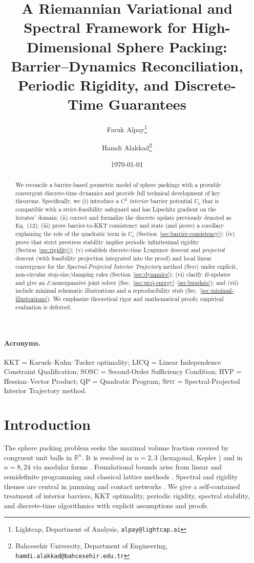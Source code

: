 \documentclass[11pt]{article}
\title{A Riemannian Variational and Spectral Framework for High-Dimensional Sphere Packing:\\
Barrier--Dynamics Reconciliation, Periodic Rigidity, and Discrete-Time Guarantees}
\author{%
  Faruk Alpay\thanks{Lightcap, Department of Analysis, \texttt{alpay@lightcap.ai}} \and
  Hamdi Alakkad\thanks{Bahcesehir University, Department of Engineering, \texttt{hamdi.alakkad@bahcesehir.edu.tr}}%
}
\date{\today}
\theoremstyle{remark}
\theoremstyle{definition}
\newcommand{\R}{\mathbb{R}}
\newcommand{\SPIT}{\textnormal{\textsc{Spit}}} %
\begin{document}
\maketitle

\begin{abstract}
We reconcile a barrier-based geometric model of sphere packings with a provably convergent discrete-time dynamics and provide full technical development of key theorems. Specifically, we (i) introduce a $C^2$ \emph{interior} barrier potential $U_\nu$ that is compatible with a strict-feasibility safeguard and has Lipschitz gradient on the iterates' domain; (ii) correct and formalize the discrete update previously denoted as Eq.~(12); (iii) prove barrier-to-KKT consistency and state (and prove) a corollary explaining the role of the quadratic term in $U_\nu$ (Section~\ref{sec:barrier-consistency}); (iv) prove that strict prestress stability implies periodic infinitesimal rigidity (Section~\ref{sec:rigidity}); (v) establish discrete-time Lyapunov descent and \emph{projected} descent (with feasibility projection integrated into the proof) and local linear convergence for the \emph{Spectral-Projected Interior Trajectory} method (\SPIT) under explicit, non-circular step-size/damping rules (Section~\ref{sec:dynamics}); (vi) clarify $B$-updates and give an \(\mathcal{E}\)-nonexpansive joint solver (Sec.~\ref{sec:proj-energy}--\ref{sec:bupdate}); and (vii) include minimal schematic illustrations and a reproducibility stub (Sec.~\ref{sec:minimal-illustrations}). We emphasize theoretical rigor and mathematical proofs; empirical evaluation is deferred.
\end{abstract}

\paragraph{Acronyms.}
KKT = Karush--Kuhn--Tucker optimality; LICQ = Linear Independence Constraint Qualification; SOSC = Second-Order Sufficiency Condition; HVP = Hessian--Vector Product; QP = Quadratic Program; \SPIT{} = Spectral-Projected Interior Trajectory method.

\section{Introduction}
The sphere packing problem seeks the maximal volume fraction covered by congruent unit balls in $\R^n$.
It is resolved in $n=2,3$ (hexagonal, Kepler \cite{Hales05,Hales17pi}) and in $n=8,24$ via modular forms \cite{Viazovska17,Cohn+17}.
Foundational bounds arise from linear and semidefinite programming \cite{CohnElkies03,BachocVallentin08,CohnZhao14,deLaatOliveiraVallentin14} and classical lattice methods \cite{Minkowski05,Voronoi08,Rogers58,KabLev78}.
Spectral and rigidity themes are central in jamming and contact networks \cite{TS10,OHern03}.
We give a self-contained treatment of interior barriers, KKT optimality, periodic rigidity, spectral stability, and discrete-time algorithmics with explicit assumptions and proofs.
\end{document}
